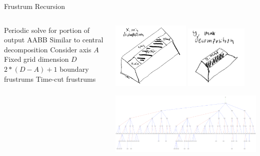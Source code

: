 \begin{frame}{Frustrum Recursion}
  \begin{columns}
  \begin{outline}
  \1 Periodic solve for portion of output AABB
  \1 Similar to central decomposition 
  \1 Consider axis $A$ 
  \1 Fixed grid dimension $D$
  \1 $2 * (D - A) + 1$ boundary frustrums
  \1 Time-cut frustrums
  \end{outline}

  \begin{center}
  \centering
  \includegraphics[width=0.5\textwidth]{frustrum_decomp.png}
  \includegraphics[width=0.4\textwidth]{frustrum_decomp_y.png}


  \includegraphics[width=\textwidth]{plan_2d_large.png}
  \end{center}
\end{columns}
\end{frame}
